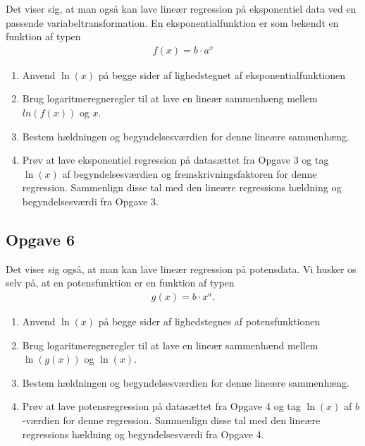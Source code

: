 \documentclass[12pt]{article}
\begin{document}
Det viser sig, at man også kan lave lineær regression på eksponentiel data ved en passende variabeltransformation. En eksponentialfunktion er som bekendt en funktion af typen
\begin{align*}
	f(x) = b\cdot a^x
\end{align*}
\begin{enumerate}[label=\roman*)]
	\item Anvend $\ln(x)$ på begge sider af lighedstegnet af eksponentialfunktionen
	\item Brug logaritmeregneregler til at lave en lineær sammenhæng mellem $ln(f(x))$ og $x$. 
	\item Bestem hældningen og begyndelsesværdien for denne lineære sammenhæng.
	\item Prøv at lave eksponentiel regression på datasættet fra Opgave 3 og tag $\ln(x)$ af begyndelsesværdien og fremskrivningsfaktoren for denne regression. Sammenlign disse tal med den lineære regressions hældning og begyndelsesværdi fra Opgave 3.
\end{enumerate}

\subsection*{Opgave 6}
Det viser sig også, at man kan lave lineær regression på potensdata. Vi husker os selv på, at en potensfunktion er en funktion af typen
\begin{align*}
	g(x) = b\cdot x^a.
\end{align*}

\begin{enumerate}[label=\roman*)]
	\item Anvend $\ln(x)$ på begge sider af lighedstegnes af potensfunktionen
	\item Brug logaritmeregneregler til at lave en lineær sammenhænd mellem $\ln(g(x))$ og $\ln(x)$.
	\item Bestem hældningen og begyndelsesværdien for denne lineære sammenhæng.
	\item Prøv at lave potensregression på datasættet fra Opgave 4 og tag $\ln(x)$ af $b$-værdien for denne regression. Sammenlign disse tal med den lineære regressions hældning og begyndelsesværdi fra Opgave 4.
\end{enumerate}
\end{document}
